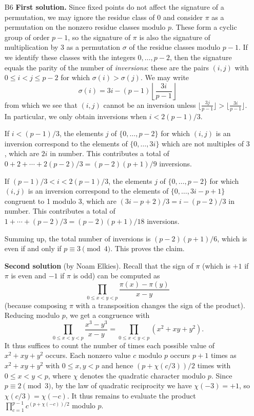 \documentclass[amssymb,twocolumn,pra,10pt,aps]{revtex4-1}
\begin{document}
\begin{itemize}
\item[B6]
\textbf{First solution.}
Since fixed points do not affect the signature of a permutation, we may
ignore the residue class of $0$ and consider $\pi$ as a permutation on the
nonzero residue classes modulo $p$. These form a cyclic group of order $p-1$,
so the signature of $\pi$ is also the signature of multiplication by 3 as
a permutation $\sigma$ of the residue classes modulo $p-1$. If we identify
these classes with the integers $0,\dots,p-2$, then the signature equals
the parity of the number of \emph{inversions}: these are the pairs $(i,j)$
with $0 \leq i < j \leq p-2$ for which $\sigma(i) > \sigma(j)$. We may write
\[
\sigma(i) = 3i - (p-1) \left\lfloor \frac{3i}{p-1} \right\rfloor
\]
from which we see that $(i,j)$ cannot be an inversion unless $\lfloor \frac{3j}{p-1} \rfloor > \lfloor \frac{3i}{p-1} \rfloor$. In particular, we only obtain inversions when $i < 2(p-1)/3$.

If $i < (p-1)/3$, the elements $j$ of $\{0,\dots,p-2\}$ for which $(i,j)$ is an inversion correspond to the elements of $\{0,\dots,3i\}$ which are not multiples of $3$, which are $2i$ in number.
This contributes a total of $0 + 2 + \cdots + 2(p-2)/3 = (p-2)(p+1)/9$ inversions.

If $(p-1)/3 < i < 2(p-1)/3$, the elements $j$ of $\{0,\dots,p-2\}$ for which $(i,j)$ is an inversion correspond
to the elements of $\{0, \dots, 3i-p+1\}$ congruent to 1 modulo 3, which are
$(3i-p+2)/3 = i - (p-2)/3$ in number. This contributes a total of
$1 + \cdots + (p-2)/3 = (p-2)(p+1)/18$ inversions.

Summing up, the total number of inversions is $(p-2)(p+1)/6$, which is even if and only if
$p \equiv 3 \pmod{4}$. This proves the claim.

\noindent
\textbf{Second solution} (by Noam Elkies).
Recall that the sign of $\pi$ (which is $+1$ if $\pi$ is even and $-1$ if $\pi$ is odd)
can be computed as
\[
\prod_{0 \leq x < y < p} \frac{\pi(x) - \pi(y)}{x - y}
\]
(because composing $\pi$ with a transposition changes the sign of the product).
Reducing modulo $p$, we get a congruence with
\[
\prod_{0 \leq x < y < p} \frac{x^3-y^3}{x-y} = \prod_{0 \leq x < y < p} (x^2 + xy + y^2).
\]
It thus suffices to count the number of times each possible value of $x^2+xy+y^2$ occurs.
Each nonzero value $c$ modulo $p$ occurs $p+1$ times as $x^2+xy+y^2$ with $0 \leq x, y < p$
and hence $(p + \chi(c/3))/2$ times with $0 \leq x < y < p$, where $\chi$ denotes the quadratic character
modulo $p$. Since $p \equiv 2 \pmod{3}$, by the law of quadratic reciprocity we have
$\chi(-3) = +1$, so $\chi(c/3) = \chi(-c)$.
It thus remains to evaluate the product $\prod_{c=1}^{p-1} c^{(p+\chi(-c))/2}$ modulo $p$.


\end{itemize}
\end{document}
